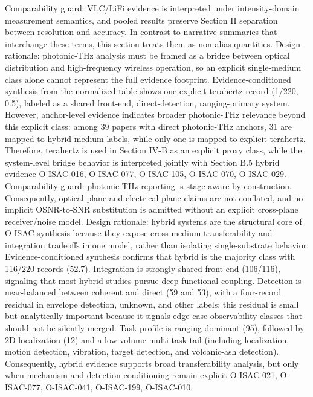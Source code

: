 {}Comparability guard: VLC/LiFi evidence is interpreted under intensity-domain measurement semantics, and pooled results preserve Section II separation between resolution and accuracy. In contrast to narrative summaries that interchange these terms, this section treats them as non-alias quantities.\markdownRendererInterblockSeparator
{}
\markdownRendererSectionEnd \markdownRendererSectionBegin
{}\markdownRendererInterblockSeparator
{}Design rationale: photonic-THz analysis must be framed as a bridge between optical distribution and high-frequency wireless operation, so an explicit single-medium class alone cannot represent the full evidence footprint.\markdownRendererParagraphSeparator
{}Evidence-conditioned synthesis from the normalized table shows one explicit terahertz record (1/220, 0.5\markdownRendererPercentSign{}), labeled as a shared front-end, direct-detection, ranging-primary system. However, anchor-level evidence indicates broader photonic-THz relevance beyond this explicit class: among 39 papers with direct photonic-THz anchors, 31 are mapped to hybrid medium labels, while only one is mapped to explicit terahertz. Therefore, terahertz is used in Section IV-B as an explicit proxy class, while the system-level bridge behavior is interpreted jointly with Section B.5 hybrid evidence O-ISAC-016, O-ISAC-077, O-ISAC-105, O-ISAC-070, O-ISAC-029.\markdownRendererParagraphSeparator
{}Comparability guard: photonic-THz reporting is stage-aware by construction. Consequently, optical-plane and electrical-plane claims are not conflated, and no implicit OSNR-to-SNR substitution is admitted without an explicit cross-plane receiver/noise model.\markdownRendererInterblockSeparator
{}
\markdownRendererSectionEnd \markdownRendererSectionBegin
{}\markdownRendererInterblockSeparator
{}Design rationale: hybrid systems are the structural core of O-ISAC synthesis because they expose cross-medium transferability and integration tradeoffs in one model, rather than isolating single-substrate behavior.\markdownRendererParagraphSeparator
{}Evidence-conditioned synthesis confirms that hybrid is the majority class with 116/220 records (52.7\markdownRendererPercentSign{}). Integration is strongly shared-front-end (106/116), signaling that most hybrid studies pursue deep functional coupling. Detection is near-balanced between coherent and direct (59 and 53), with a four-record residual in envelope detection, unknown, and other labels; this residual is small but analytically important because it signals edge-case observability classes that should not be silently merged. Task profile is ranging-dominant (95), followed by 2D localization (12) and a low-volume multi-task tail (including localization, motion detection, vibration, target detection, and volcanic-ash detection). Consequently, hybrid evidence supports broad transferability analysis, but only when mechanism and detection conditioning remain explicit O-ISAC-021, O-ISAC-077, O-ISAC-041, O-ISAC-199, O-ISAC-010.\markdownRendererParagraphSeparator
